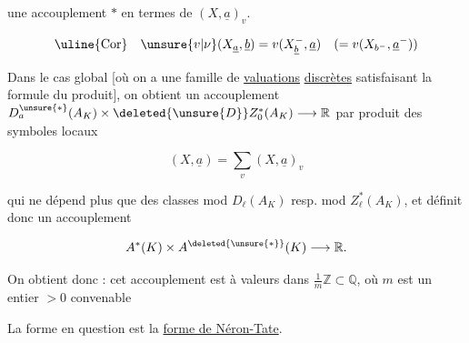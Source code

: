 une  accouplement $*$ en termes
de $(X,\underline a)_v$. 

\[
 \text{\uline{Cor}}\quad\unsure{v|\nu}(X_{\underline a},\underline b)=v(X_{\underline b}^{-},\underline a)\quad(=v(X_{b^{-}},\underline a^{-}))
\]

Dans le cas global [où on a une
famille de \uline{valuations} \uline{discrètes} satisfaisant la
formule du produit], on obtient un
accouplement $D_a^{\unsure{*}}(A_K)\times\deleted{\unsure{D}}Z_0^*(A_K)\longrightarrow\mathbb R$
par  produit des symboles locaux

\[
 (X,\underline a)=\sum_v(X,\underline a)_v
\]

qui ne dépend plus que des classes 
mod $D_\ell(A_K)$ resp. mod $Z_\ell^*(A_K)$, et définit
donc un accouplement

\[
 A^*(K)\times A^{\deleted{\unsure{*}}}(K)\longrightarrow\mathbb R .
\]

On obtient donc : cet accouplement est
à valeurs dans $\frac1m\mathbb Z\subset\mathbb Q$, où
$m$ est un entier $>0$ convenable

La forme en question est la \uline{forme de
Néron-Tate}. 

